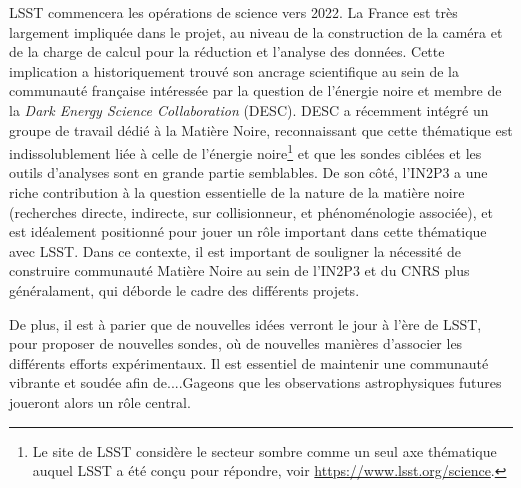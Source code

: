 \documentclass[12pt]{article}
\begin{document}
LSST commencera les opérations de science vers 2022. La France est très largement impliquée dans le projet, au niveau de la construction de la caméra et de la charge de calcul pour la réduction et l'analyse des données. Cette implication a historiquement trouvé son ancrage scientifique au sein de la communauté française intéressée par la question de l'énergie noire et membre de la {\it Dark Energy Science Collaboration} (DESC). DESC a récemment intégré un groupe de travail dédié à la Matière Noire, reconnaissant que cette thématique est indissolublement liée à celle de l'énergie noire\footnote{Le site de LSST considère le secteur sombre comme un seul axe thématique auquel LSST a été conçu pour répondre, voir \href{https://www.lsst.org/science}{https://www.lsst.org/science}. } et que les sondes ciblées et les outils d'analyses sont en grande partie semblables.
De son côté, l'IN2P3 a une riche contribution à la question essentielle de la nature de la matière noire (recherches directe, indirecte, sur collisionneur, et phénoménologie associée), et est idéalement positionné pour jouer un rôle important dans cette thématique avec LSST. Dans ce contexte, il est important de souligner la nécessité de construire communauté Matière Noire au sein de l'IN2P3 et du CNRS plus généralament, qui déborde le cadre des différents projets. 

De plus, il est à parier que de nouvelles idées verront le jour à l'ère de LSST, pour proposer de nouvelles sondes, où de nouvelles manières d'associer les différents efforts expérimentaux. Il est essentiel de maintenir une communauté vibrante et soudée afin de....Gageons que les observations astrophysiques futures joueront alors un rôle central.


\def\bibname{References}
\begingroup
  \small
  \setlength{\bibsep}{0pt plus 0.5ex}
  
  
\endgroup

\end{document}
